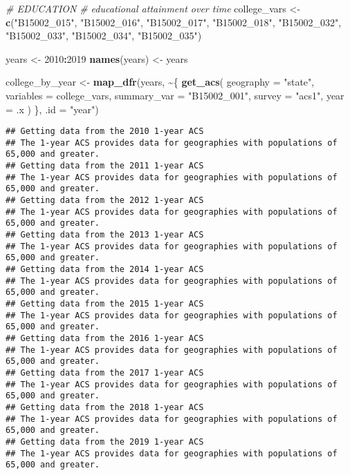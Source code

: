 \documentclass[
]{article}
\newenvironment{Shaded}{\begin{snugshade}}{\end{snugshade}}
\newcommand{\AttributeTok}[1]{\textcolor[rgb]{0.13,0.29,0.53}{#1}}
\newcommand{\CommentTok}[1]{\textcolor[rgb]{0.56,0.35,0.01}{\textit{#1}}}
\newcommand{\DecValTok}[1]{\textcolor[rgb]{0.00,0.00,0.81}{#1}}
\newcommand{\FunctionTok}[1]{\textcolor[rgb]{0.13,0.29,0.53}{\textbf{#1}}}
\newcommand{\NormalTok}[1]{#1}
\newcommand{\OtherTok}[1]{\textcolor[rgb]{0.56,0.35,0.01}{#1}}
\newcommand{\SpecialCharTok}[1]{\textcolor[rgb]{0.81,0.36,0.00}{\textbf{#1}}}
\newcommand{\StringTok}[1]{\textcolor[rgb]{0.31,0.60,0.02}{#1}}
\begin{document}
\begin{Shaded}
\begin{Highlighting}[]
\CommentTok{\# EDUCATION}
\CommentTok{\# educational attainment over time}
\NormalTok{college\_vars }\OtherTok{\textless{}{-}} \FunctionTok{c}\NormalTok{(}\StringTok{"B15002\_015"}\NormalTok{,}
                  \StringTok{"B15002\_016"}\NormalTok{,}
                  \StringTok{"B15002\_017"}\NormalTok{,}
                  \StringTok{"B15002\_018"}\NormalTok{,}
                  \StringTok{"B15002\_032"}\NormalTok{,}
                  \StringTok{"B15002\_033"}\NormalTok{,}
                  \StringTok{"B15002\_034"}\NormalTok{,}
                  \StringTok{"B15002\_035"}\NormalTok{)}

\NormalTok{years }\OtherTok{\textless{}{-}} \DecValTok{2010}\SpecialCharTok{:}\DecValTok{2019}
\FunctionTok{names}\NormalTok{(years) }\OtherTok{\textless{}{-}}\NormalTok{ years}

\NormalTok{college\_by\_year }\OtherTok{\textless{}{-}} \FunctionTok{map\_dfr}\NormalTok{(years, }\SpecialCharTok{\textasciitilde{}}\NormalTok{\{}
  \FunctionTok{get\_acs}\NormalTok{(}
    \AttributeTok{geography =} \StringTok{"state"}\NormalTok{,}
    \AttributeTok{variables =}\NormalTok{ college\_vars,}
    \AttributeTok{summary\_var =} \StringTok{"B15002\_001"}\NormalTok{,}
    \AttributeTok{survey =} \StringTok{"acs1"}\NormalTok{,}
    \AttributeTok{year =}\NormalTok{ .x}
\NormalTok{  )}
\NormalTok{\}, }\AttributeTok{.id =} \StringTok{"year"}\NormalTok{)}
\end{Highlighting}
\end{Shaded}

\begin{verbatim}
## Getting data from the 2010 1-year ACS
## The 1-year ACS provides data for geographies with populations of 65,000 and greater.
## Getting data from the 2011 1-year ACS
## The 1-year ACS provides data for geographies with populations of 65,000 and greater.
## Getting data from the 2012 1-year ACS
## The 1-year ACS provides data for geographies with populations of 65,000 and greater.
## Getting data from the 2013 1-year ACS
## The 1-year ACS provides data for geographies with populations of 65,000 and greater.
## Getting data from the 2014 1-year ACS
## The 1-year ACS provides data for geographies with populations of 65,000 and greater.
## Getting data from the 2015 1-year ACS
## The 1-year ACS provides data for geographies with populations of 65,000 and greater.
## Getting data from the 2016 1-year ACS
## The 1-year ACS provides data for geographies with populations of 65,000 and greater.
## Getting data from the 2017 1-year ACS
## The 1-year ACS provides data for geographies with populations of 65,000 and greater.
## Getting data from the 2018 1-year ACS
## The 1-year ACS provides data for geographies with populations of 65,000 and greater.
## Getting data from the 2019 1-year ACS
## The 1-year ACS provides data for geographies with populations of 65,000 and greater.
\end{verbatim}
\end{document}
